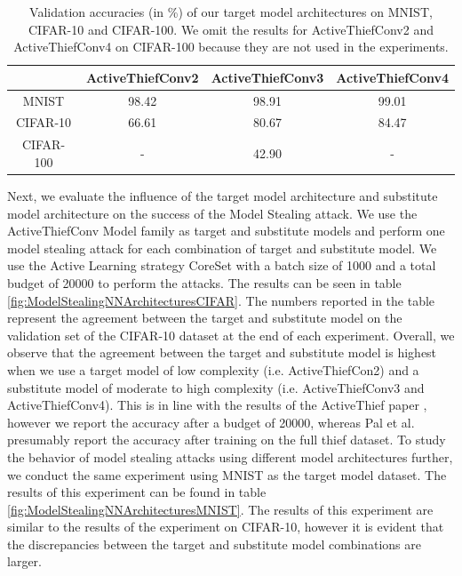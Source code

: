 \begin{table}[h]
    \centering
    \begin{tabular}{|c|| c | c | c|} 
        \hline
        & ActiveThiefConv2 & ActiveThiefConv3 & ActiveThiefConv4 \\ 
        \hline 
        MNIST & 98.42 & 98.91 & 99.01 \\
        \hline
        CIFAR-10 & 66.61 & 80.67 & 84.47 \\
        \hline
        CIFAR-100 & - & 42.90 & - \\
        \hline
    \end{tabular}
    \caption[Validation accuracies of our target model architectures]{Validation accuracies (in \%) of our target model architectures on MNIST, CIFAR-10 and CIFAR-100. 
    We omit the results for ActiveThiefConv2 and ActiveThiefConv4 on CIFAR-100 because they are not used in the experiments.}
    \label{fig:TargetModelAccuracies}
\end{table}

Next, we evaluate the influence of the target model architecture and substitute model architecture on the success of the Model Stealing attack. We use the ActiveThiefConv Model family as target and substitute models and perform one model stealing attack for each combination of
target and substitute model. We use the Active Learning strategy CoreSet with a batch size of 1000 and a total budget of 20000 to perform the attacks. The results can be seen in table \ref{fig:ModelStealingNNArchitecturesCIFAR}. The numbers reported in the table represent the 
agreement between the target and substitute model on the validation set of the CIFAR-10 dataset at the end of each experiment. Overall, we observe that the agreement between the target and substitute model is highest when we use a target model of low complexity (i.e. ActiveThiefCon2)
and a substitute model of moderate to high complexity (i.e. ActiveThiefConv3 and ActiveThiefConv4). This is in line with the results of the ActiveThief paper \cite{pal2020activethief}, however we report the accuracy after a budget of 20000, whereas Pal et al. presumably report the
accuracy after training on the full thief dataset. To study the behavior of model stealing attacks using different model architectures further, we conduct the same experiment using MNIST as the target model dataset. The results of this experiment can be found in table 
\ref{fig:ModelStealingNNArchitecturesMNIST}. The results of this experiment are similar to the results of the experiment on CIFAR-10, however it is evident that the discrepancies between the target and substitute model combinations are larger. \par


